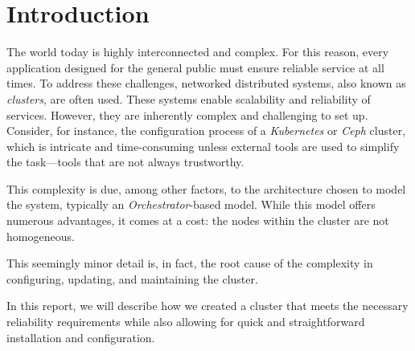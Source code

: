 
\section{Introduction}
The world today is highly interconnected and complex. For this reason, every application 
designed for the general public must ensure reliable service at all times. To address 
these challenges, networked distributed systems, also known as \textit{clusters}, are 
often used. These systems enable scalability and reliability of services. However, they 
are inherently complex and challenging to set up. Consider, for instance, the configuration 
process of a \textit{Kubernetes} or \textit{Ceph} cluster, which is intricate and 
time-consuming unless external tools are used to simplify the task—tools that are not always 
trustworthy.  

This complexity is due, among other factors, to the architecture chosen to model the system, 
typically an \textit{Orchestrator}-based model. While this model offers numerous advantages, 
it comes at a cost: the nodes within the cluster are not homogeneous.  

This seemingly minor detail is, in fact, the root cause of the complexity in configuring, 
updating, and maintaining the cluster.  

In this report, we will describe how we created a cluster that meets the necessary reliability 
requirements while also allowing for quick and straightforward installation and configuration.

